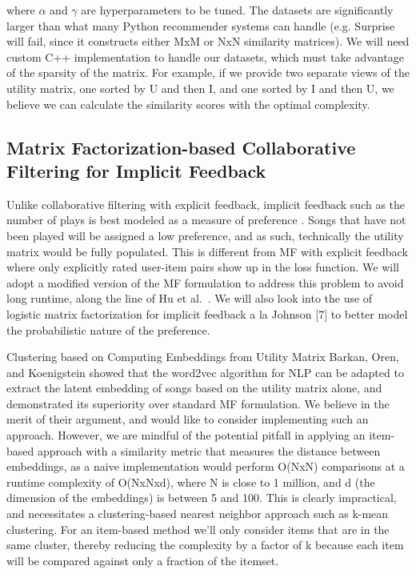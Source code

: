 \documentclass[10pt]{article}
\begin{document}
where $\alpha$ and $\gamma$ are hyperparameters to be tuned. The datasets are significantly larger than what many Python recommender systems can handle (e.g. Surprise will fail, since it constructs either MxM or NxN similarity matrices). We will need custom C++ implementation to handle our datasets, which must take advantage of the sparsity of the matrix. For example, if we provide two separate views of the utility matrix, one sorted by U and then I, and one sorted by I and then U, we believe we can calculate the similarity scores with the optimal complexity.

\subsection{Matrix Factorization-based Collaborative Filtering for Implicit Feedback}

Unlike collaborative filtering with explicit feedback, implicit feedback such as the number of plays is best modeled as a measure of preference \cite{hu2008collaborative}. Songs that have not been played will be assigned a low preference, and as such, technically the utility matrix would be fully populated. This is different from MF with explicit feedback where only explicitly rated user-item pairs show up in the loss function. We will adopt a modified version of the MF formulation to address this problem to avoid long runtime, along the line of Hu et al.~\cite{johnson2014logistic}. We will also look into the use of logistic matrix factorization for implicit feedback a la Johnson [7] to better model the probabilistic nature of the preference.

Clustering based on Computing Embeddings from Utility Matrix
Barkan, Oren, and Koenigstein \cite{barkan2016item2vec} showed that the word2vec algorithm for NLP can be adapted to extract the latent embedding of songs based on the utility matrix alone, and demonstrated its superiority over standard MF formulation. We believe in the merit of their argument, and would like to consider implementing such an approach. However, we are mindful of the potential pitfall in applying an item-based approach with a similarity metric that measures the distance between embeddings, as a naive implementation would perform O(NxN) comparisons at a runtime complexity of O(NxNxd), where N is close to 1 million, and d (the dimension of the embeddings) is between 5 and 100. This is clearly impractical, and necessitates a clustering-based nearest neighbor approach such as k-mean clustering. For an item-based method we’ll only consider items that are in the same cluster, thereby reducing the complexity by a factor of k because each item will be compared against only a fraction of the itemset.
\end{document}
